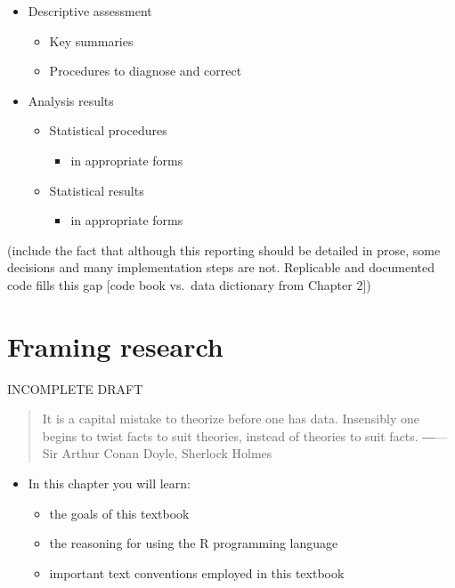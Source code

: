 \documentclass[
]{article}
\providecommand{\tightlist}{%
  \setlength{\itemsep}{0pt}\setlength{\parskip}{0pt}}
\newenvironment{rmdblock}[1]
  {\begin{shaded*}
  \begin{itemize}
  \renewcommand{\labelitemi}{
    \raisebox{-.5\height}[0pt][0pt]{
      {\setkeys{Gin}{width=2em,keepaspectratio}\texttt{[image: assets/images/\#1]}}
    }
  }
  \item
  }
  {
  \end{itemize}
  \end{shaded*}
  }
\newenvironment{rmdkey}
  {\begin{rmdblock}{key}}
  {\end{rmdblock}}
\begin{document}
\begin{itemize}
\tightlist
\item
  Descriptive assessment

  \begin{itemize}
  \tightlist
  \item
    Key summaries
  \item
    Procedures to diagnose and correct
  \end{itemize}
\item
  Analysis results

  \begin{itemize}
  \tightlist
  \item
    Statistical procedures

    \begin{itemize}
    \tightlist
    \item
      in appropriate forms
    \end{itemize}
  \item
    Statistical results

    \begin{itemize}
    \tightlist
    \item
      in appropriate forms
    \end{itemize}
  \end{itemize}
\end{itemize}

(include the fact that although this reporting should be detailed in prose, some decisions and many implementation steps are not. Replicable and documented code fills this gap {[}code book vs.~data dictionary from Chapter 2{]})

\hypertarget{framing-research}{%
\section{Framing research}\label{framing-research}}

INCOMPLETE DRAFT

\begin{quote}
It is a capital mistake to theorize before one has data. Insensibly one begins to twist facts to suit theories, instead of theories to suit facts.
―---Sir Arthur Conan Doyle, Sherlock Holmes
\end{quote}

\begin{rmdkey}
In this chapter you will learn:

\begin{itemize}
\tightlist
\item
  the goals of this textbook
\item
  the reasoning for using the R programming language
\item
  important text conventions employed in this textbook
\end{itemize}
\end{rmdkey}
\end{document}
